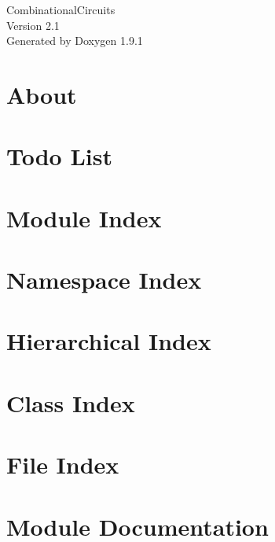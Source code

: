 \let\mypdfximage\pdfximage\def\pdfximage{\immediate\mypdfximage}\documentclass[twoside]{book}
\newcommand{\+}{\discretionary{\mbox{\scriptsize$\hookleftarrow$}}{}{}}
\newcommand{\clearemptydoublepage}{%
  \newpage{\pagestyle{empty}\cleardoublepage}%
}
\begin{document}
\raggedbottom

\hypersetup{pageanchor=false,
             bookmarksnumbered=true,
             pdfencoding=unicode
            }
\begin{titlepage}
\vspace*{7cm}
\begin{center}%
{\Large Combinational\+Circuits \\[1ex]\large Version 2.\+1 }\\
\vspace*{1cm}
{\large Generated by Doxygen 1.9.1}\\
\end{center}
\end{titlepage}
\clearemptydoublepage
{}
\tableofcontents
\clearemptydoublepage
{}
\hypersetup{pageanchor=true}

\chapter{About}
\label{about}

\chapter{Todo List}
\label{todo}

\chapter{Module Index}

\chapter{Namespace Index}

\chapter{Hierarchical Index}

\chapter{Class Index}

\chapter{File Index}

\chapter{Module Documentation}

\end{document}
